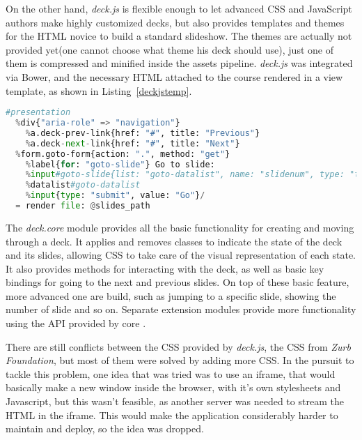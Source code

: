 On the other hand, \textit{deck.js} is flexible enough to let advanced CSS and JavaScript authors make
highly customized decks, but also provides templates and themes for the HTML novice to build a standard
slideshow. The themes are actually not provided yet(one cannot choose what theme
his deck should use), just one of them is compressed and minified inside the assets pipeline.
\textit{deck.js} was integrated via Bower, and the necessary HTML attached to the
course rendered in a view template, as shown in Listing~\ref{deckjstemp}.
\begin{lstlisting}[language=Python, caption={deck.js template}, label=deckjstemp]
%h4 #{@course.title}, by #{@course.user.handle}, lasts #{@course.duration} hours
#presentation
  %div{"aria-role" => "navigation"}
    %a.deck-prev-link{href: "#", title: "Previous"}
    %a.deck-next-link{href: "#", title: "Next"}
  %form.goto-form{action: ".", method: "get"}
    %label{for: "goto-slide"} Go to slide:
    %input#goto-slide{list: "goto-datalist", name: "slidenum", type: "text"}/
    %datalist#goto-datalist
    %input{type: "submit", value: "Go"}/
  = render file: @slides_path
\end{lstlisting}
The \textit{deck.core} module provides all the basic functionality for creating and
moving through a deck. It applies and removes classes to indicate the state of
the deck and its slides, allowing CSS to take care of the visual representation
of each state. It also provides methods for interacting with the deck, as well
as basic key bindings for going to the next and previous slides. On top of these
basic feature, more advanced one are build, such as jumping to a specific slide, showing
the number of slide and so on. Separate extension modules provide more
functionality using the API provided by core \citep{imakewebthings}.

There are still conflicts between the CSS provided by \textit{deck.js}, the CSS from \textit{Zurb Foundation},
but most of them were solved by adding more CSS. In the pursuit to tackle this problem,
one idea that was tried was to use an iframe, that would basically make a new window
inside the browser, with it's own stylesheets and Javascript, but this wasn't feasible,
as another server was needed to stream the HTML in the iframe. This would make the application
considerably harder to maintain and deploy, so the idea was dropped.
%

